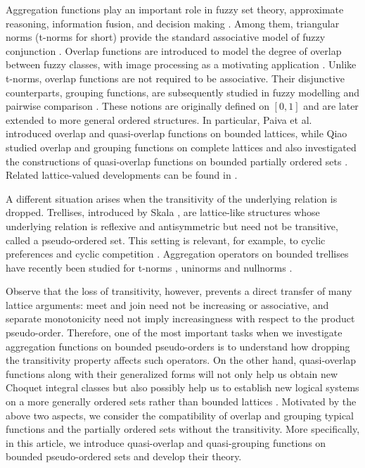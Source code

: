 \documentclass[preprint,12pt]{elsarticle}
\begin{document}
Aggregation functions play an important role in fuzzy set theory, approximate reasoning, information fusion, and decision making \cite{Beliakov2007,Grabisch2009}. Among them, triangular norms (t-norms for short) provide the standard associative model of fuzzy conjunction \cite{Klement2000,Menger1942,Schweizer1983}. Overlap functions are introduced to model the degree of overlap between fuzzy classes, with image processing as a motivating application \cite{Bustince2010}. Unlike t-norms, overlap functions are not required to be associative. Their disjunctive counterparts, grouping functions, are subsequently studied in fuzzy modelling and pairwise comparison \cite{Bustince2012,Bedregal2013}. These notions are originally defined on $[0,1]$ and are later extended to more general ordered structures. In particular, Paiva et al.\ \cite{Paiva2021} introduced overlap and quasi-overlap functions on bounded lattices, while Qiao studied overlap and grouping functions on complete lattices \cite{Qiao2021} and also investigated the constructions of quasi-overlap functions on bounded partially ordered sets \cite{Qiao2022}. Related lattice-valued developments can be found in \cite{Ertugrul2015, QiaoZhao2022,Ouyang2021,SunPangZhang2022,Monteiro2024}.

A different situation arises when the transitivity of the underlying relation is dropped. Trellises, introduced by Skala \cite{Skala1971,Skala1972}, are lattice-like structures whose underlying relation is reflexive and antisymmetric but need not be transitive, called a pseudo-ordered set. This setting is relevant, for example, to cyclic
preferences and cyclic competition \cite{Fishburn1970,Kerr2002}. Aggregation operators on bounded trellises have recently been studied for t-norms \cite{Zedam2023,Geng2026}, uninorms and nullnorms \cite{Kong2024,Xiu2025,JiangWangLiu2025,KongLiu2026}.

Observe that the loss of transitivity, however, prevents a direct transfer of many lattice arguments: meet and join need not be increasing or associative, and separate monotonicity need not imply increasingness with respect to the product pseudo-order. Therefore, one of the most important tasks when we investigate aggregation functions on bounded pseudo-orders is to understand how dropping the transitivity property affects such operators. On the other hand, quasi-overlap functions along with their generalized forms will not only help us obtain new Choquet integral classes but also possibly help us to establish new logical systems on a more generally ordered sets rather than bounded lattices \cite{Qiao2022}. Motivated by the above two aspects, we consider the compatibility of overlap and grouping typical functions and the partially ordered sets without the transitivity. More specifically, in this article, we introduce quasi-overlap and quasi-grouping functions on bounded pseudo-ordered sets and develop their theory.
\end{document}
